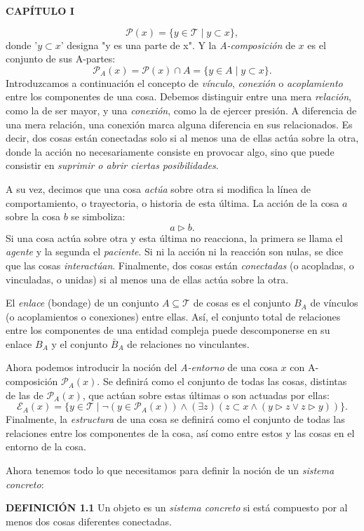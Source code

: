\newpage
\fancyhf{}
\fancyhead[l]{\thepage} 

\begin{center}
{\fontsize{13}{16}\selectfont \textbf{CAPÍTULO I}}
\end{center}

\vspace{1cm}

{\fontsize{13}{15}\selectfont
$$ \mathcal{P}(x) = \{y \in \mathcal{T} \mid y \subset x\}, $$
donde '$y \subset x$' designa "y es una parte de x". Y la \textit{A-composición} de $x$ es el conjunto de sus A-partes:
$$ \mathcal{P}_A(x) = \mathcal{P}(x) \cap A = \{y \in A \mid y \subset x\}. $$
Introduzcamos a continuación el concepto de \textit{vínculo}, \textit{conexión} o \textit{acoplamiento} entre los componentes de una cosa. Debemos distinguir entre una mera \textit{relación}, como la de ser mayor, y una \textit{conexión}, como la de ejercer presión. A diferencia de una mera relación, una conexión marca alguna diferencia en sus relacionados. Es decir, dos cosas están conectadas solo si al menos una de ellas actúa sobre la otra, donde la acción no necesariamente consiste en provocar algo, sino que puede consistir en \textit{suprimir o abrir ciertas posibilidades}.

A su vez, decimos que una cosa \textit{actúa} sobre otra si modifica la línea de comportamiento, o trayectoria, o historia de esta última. La acción de la cosa $a$ sobre la cosa $b$ se simboliza:
$$ a \triangleright b. $$
Si una cosa actúa sobre otra y esta última no reacciona, la primera se llama el \textit{agente} y la segunda el \textit{paciente}. Si ni la acción ni la reacción son nulas, se dice que las cosas \textit{interactúan}. Finalmente, dos cosas están \textit{conectadas} (o acopladas, o vinculadas, o unidas) si al menos una de ellas actúa sobre la otra.

El \textit{enlace} (bondage) de un conjunto $A \subseteq \mathcal{T}$ de cosas es el conjunto $B_A$ de vínculos (o acoplamientos o conexiones) entre ellas. Así, el conjunto total de relaciones entre los componentes de una entidad compleja puede descomponerse en su enlace $B_A$ y el conjunto $\bar{B}_A$ de relaciones no vinculantes.

Ahora podemos introducir la noción del \textit{A-entorno} de una cosa $x$ con A-composición $\mathcal{P}_A(x)$. Se definirá como el conjunto de todas las cosas, distintas de las de $\mathcal{P}_A(x)$, que actúan sobre estas últimas o son actuadas por ellas:
$$ \mathcal{E}_A(x) = \{y \in \mathcal{T} \mid \neg (y \in \mathcal{P}_A(x)) \land (\exists z)(z \subset x \land (y \triangleright z \lor z \triangleright y))\}. $$
Finalmente, la \textit{estructura} de una cosa se definirá como el conjunto de todas las relaciones entre los componentes de la cosa, así como entre estos y las cosas en el entorno de la cosa.

Ahora tenemos todo lo que necesitamos para definir la noción de un \textit{sistema concreto}:

\textbf{DEFINICIÓN 1.1} Un objeto es un \textit{sistema concreto} si está compuesto por al menos dos cosas diferentes conectadas.
}


